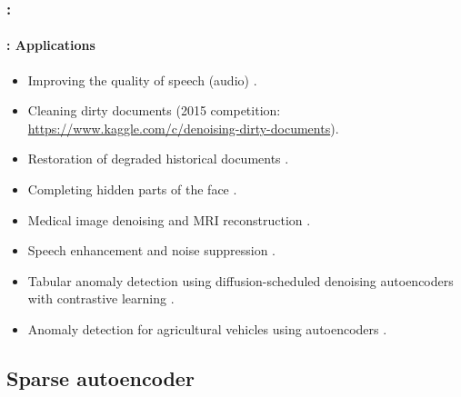\documentclass[xcolor=table]{beamer}
\begin{document}
	\begin{frame}
		\frametitle{\insertshortsubtitle: \insertsection}
		\framesubtitle{\insertsubsection: Applications}
		
		\begin{itemize}
			\item Improving the quality of speech (audio) \cite{2013-lu}.
			\item Cleaning dirty documents (2015 competition: \url{https://www.kaggle.com/c/denoising-dirty-documents}).
			\item Restoration of degraded historical documents \cite{2019-neji}.
			\item Completing hidden parts of the face \cite{2017-li-al}.
			\item Medical image denoising and MRI reconstruction \cite{2016-gondara}.
			
			\item Speech enhancement and noise suppression \cite{2020-yu-al}.
			
			\item Tabular anomaly detection using diffusion-scheduled denoising autoencoders with contrastive learning \cite{2025-sattarov}.
			\item Anomaly detection for agricultural vehicles using autoencoders \cite{2022-mujkic}.
		\end{itemize}
		
	\end{frame}
	
	\subsection{Sparse autoencoder}
	
\end{document}
